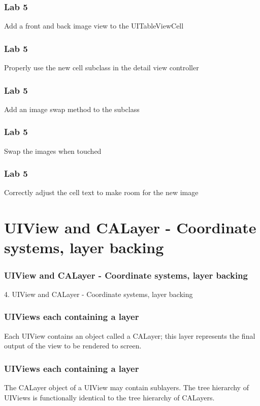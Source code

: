 \documentclass[10pt]{beamer}
\begin{document}
\begin{frame}[fragile]
  \frametitle{Lab 5}
  Add a front and back image view to the UITableViewCell

\end{frame}

\begin{frame}[fragile]
  \frametitle{Lab 5}
  Properly use the new cell subclass in the detail view controller

\end{frame}

\begin{frame}[fragile]
  \frametitle{Lab 5}
  Add an image swap method to the subclass

\end{frame}

\begin{frame}[fragile]
  \frametitle{Lab 5}
  Swap the images when touched

\end{frame}

\begin{frame}[fragile]
  \frametitle{Lab 5}
  Correctly adjust the cell text to make room for the new image

\end{frame}

    

   
  

  
    
\section{UIView and CALayer - Coordinate systems, layer backing}
\begin{frame}[fragile]
  \frametitle{UIView and CALayer - Coordinate systems, layer backing}
  4. UIView and CALayer - Coordinate systems, layer backing
\end{frame}


    
\begin{frame}[fragile]
  \frametitle{UIViews each containing a layer}
  Each UIView contains an object called a CALayer; this layer represents the final output of the view to be rendered to screen.

\end{frame}

\begin{frame}[fragile]
  \frametitle{UIViews each containing a layer}
  The CALayer object of a UIView may contain sublayers. The tree hierarchy of UIViews is functionally identical to the tree hierarchy of CALayers.

\end{frame}
\end{document}
